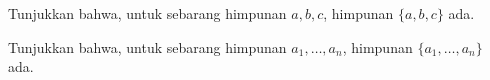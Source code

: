 \documentclass[../../../include/open-logic-section]{subfiles}
\begin{document}
\begin{prob}
Tunjukkan bahwa, untuk sebarang himpunan $a,b,c$, himpunan $\{a,b,c\}$ ada.
\end{prob}

\begin{prob}
Tunjukkan bahwa, untuk sebarang himpunan $a_1,\ldots,a_n$, himpunan
$\{a_1,\ldots,a_n\}$ ada.
\end{prob}

\end{document}

